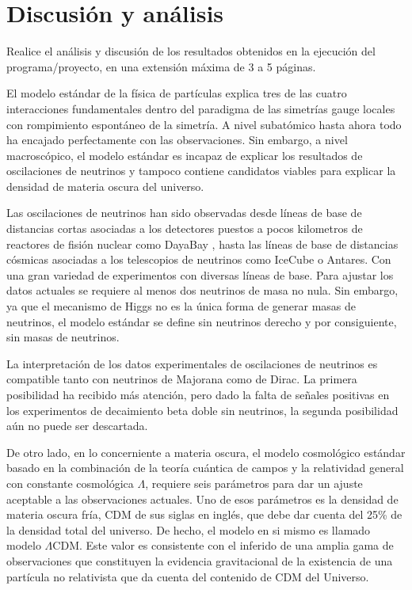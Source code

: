 \section{Discusión y análisis  }
\begin{instrucciones}
  Realice el análisis y discusión de los resultados obtenidos en la ejecución del programa/proyecto, en una extensión máxima de 3 a 5 páginas.
\end{instrucciones}
El modelo estándar de la física de partículas explica tres de las
cuatro interacciones fundamentales dentro del paradigma de las
simetrías gauge locales con rompimiento espontáneo de la simetría. A
nivel subatómico hasta ahora todo ha encajado perfectamente con las
observaciones. Sin embargo, a nivel macroscópico, el modelo estándar
es incapaz de explicar los resultados de oscilaciones de neutrinos y
tampoco contiene candidatos viables para explicar la densidad de materia
oscura del universo.

Las oscilaciones de neutrinos han sido observadas desde  líneas de
base de distancias cortas asociadas a los detectores puestos a pocos kilometros de
reactores de fisión nuclear como DayaBay%
,
hasta las líneas de
base de distancias cósmicas asociadas a los telescopios de neutrinos
como IceCube %
 o Antares. %
Con una gran variedad de experimentos con diversas líneas de base. Para ajustar los datos
actuales se requiere al menos dos neutrinos de masa no nula. Sin
embargo, ya que el mecanismo de Higgs no es la única forma de generar
masas de neutrinos, el modelo estándar se define sin neutrinos derecho
y por consiguiente, sin masas de neutrinos.

La interpretación de los datos experimentales de oscilaciones de
neutrinos es compatible tanto con neutrinos de Majorana como de
Dirac. La primera posibilidad ha recibido más atención, pero dado la
falta de señales positivas en los experimentos de decaimiento beta
doble sin neutrinos, la segunda posibilidad aún no puede ser
descartada.

De otro lado, en lo concerniente a materia oscura, el modelo cosmológico estándar basado en la combinación de la teoría
cuántica de campos y la relatividad general con constante cosmológica
$\Lambda$, requiere seis parámetros para dar un ajuste aceptable a las
observaciones actuales. Uno de esos parámetros es la densidad de
materia oscura fría, CDM  de sus siglas en inglés, que debe dar cuenta
del 25\% de la densidad total del universo. De hecho, el modelo en si
mismo es llamado modelo $\Lambda$CDM.  Este valor es consistente con el
inferido de una amplia gama de observaciones que constituyen la
evidencia gravitacional de la existencia de una partícula no
relativista que da cuenta del contenido de CDM del Universo.

